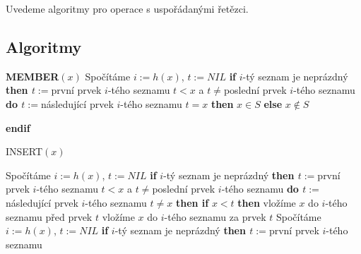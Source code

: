 \documentclass[a4paper,12pt]{article}
\begin{document}
Uvedeme algoritmy pro operace s uspořádanými 
ře\-těz\-ci.

\subsection{
Algoritmy
}

{\bf MEMBER$(x)$}\newline 
Spočítáme $i:=h(x)$, $t:=NIL$\newline 
{\bf if} $i$-tý seznam je neprázdný {\bf then\newline 
\phantom{{\rm ---}}$t:=$}první prvek $i$-tého seznamu\newline 
\phantom{---}{\bf while} $t<x$ a $t\ne$poslední prvek $i$-tého seznamu {\bf do\newline 
\phantom{{\rm ------}}$t:=$}následující prvek $i$-tého seznamu\newline 
\phantom{---}{\bf enddo\newline 
endif \newline 
if} $t=x$ {\bf then} $x\in S$ {\bf else} $x\notin S$ {\bf endif

INSERT$(x)$}\newline 
Spočítáme $i:=h(x)$, $t:=NIL$\newline 
{\bf if} $i$-tý seznam je neprázdný {\bf then\newline 
\phantom{{\rm ---}}$t:=$}první prvek $i$-tého seznamu\newline 
\phantom{---}{\bf while} $t<x$ a $t\ne$poslední prvek $i$-tého seznamu {\bf do\newline 
\phantom{{\rm ------}}$t:=$}následující prvek $i$-tého seznamu\newline 
\phantom{---}{\bf enddo\newline 
endif \newline 
if} $t\ne x$ {\bf then\newline 
\phantom{{\rm ---}}if} $x<t$ {\bf then\newline 
\phantom{{\rm ------}}}vložíme $x$ do $i$-tého seznamu před prvek $
t$\newline 
\phantom{---}{\bf else}\newline  
\phantom{------}vložíme $x$ do $i$-tého seznamu za prvek $
t$\newline 
\phantom{---}{\bf endif\newline 
endif

DELETE$(x)$}\newline 
Spočítáme $i:=h(x)$, $t:=NIL$\newline
{\bf if} $i$-tý seznam je neprázdný {\bf then\newline 
\phantom{{\rm ---}}$t:=$}první prvek $i$-tého seznamu\newline 
\end{document}
